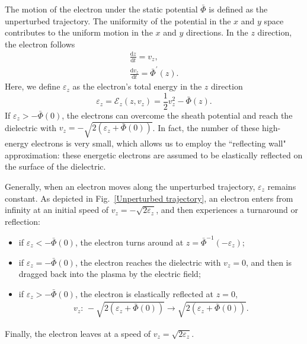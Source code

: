 \documentclass[superscriptaddress,preprint]{revtex4}  %
\begin{document}
The motion of the electron under the static potential $\bar\Phi$ is defined as the unperturbed trajectory. The uniformity of the potential in the $x$ and $y$ space contributes to the uniform motion in the $x$ and $y$ directions. In the $z$ direction, the electron follows
\begin{gather}
	\frac{\mathrm{d}z}{\mathrm{d}t}= v_z,\\
	\frac{\mathrm{d}v_z}{\mathrm{d}t}=\bar\Phi^\prime(z).
\end{gather}
Here, we define $\varepsilon_z$ as the electron's total energy in the $z$ direction
\begin{equation}
\varepsilon_z=\mathcal{E}_z (z,v_z) = \frac{1}{2} v_z^2 - \bar\Phi(z).
\end{equation}
If $\varepsilon_z>-\bar\Phi(0)$, the electrons can overcome the sheath potential and reach the dielectric with $v_z=-\sqrt{2(\varepsilon_z+\bar\Phi(0))}$. In fact, the number of these high-energy electrons is very small, which allows us to employ the ``reflecting wall" approximation: these energetic electrons are assumed to be elastically reflected on the surface of the dielectric.

Generally, when an electron moves along the unperturbed trajectory, $\varepsilon_z$ remains constant. As depicted in Fig.~\ref{Unperturbed trajectory}, an electron enters from infinity at an initial speed of $v_z=-\sqrt{2\varepsilon_z}$, and then experiences a turnaround or reflection:
\begin{itemize}
	\item if $\varepsilon_z<-\bar\Phi(0)$, the electron turns around at $z={\bar\Phi}^{-1}\left(-\varepsilon_z\right)$;
	\item if $\varepsilon_z=-\bar\Phi(0)$, the electron reaches the dielectric with $v_z=0$, and then is dragged back into the plasma by the electric field;
	\item if $\varepsilon_z>-\bar\Phi(0)$, the electron is elastically reflected at $z=0$, 
	\begin{align}
	v_z:\,-\sqrt{2(\varepsilon_z+\bar\Phi(0))} \rightarrow \sqrt{2(\varepsilon_z+\bar\Phi(0))}.
	\end{align}
\end{itemize}
Finally, the electron leaves at a speed of $v_z=\sqrt{2\varepsilon_z}$.
\end{document}
